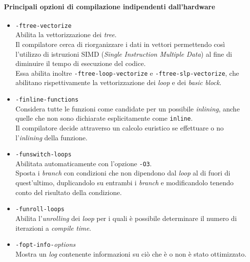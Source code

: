 \paragraph{Principali opzioni di compilazione indipendenti dall'hardware}

\begin{itemize}
  
  \item \verb|-ftree-vectorize|\\
  Abilita la vettorizzazione dei \emph{tree}.\\
  Il compilatore cerca di riorganizzare i dati in vettori permettendo così 
  l'utilizzo di istruzioni SIMD (\emph{Single Instruction Multiple Data}) al 
  fine di diminuire il tempo di esecuzione del codice.\\ %
  Essa abilita inoltre \verb|-ftree-loop-vectorize| e 
  \verb|-ftree-slp-vectorize|, che abilitano rispettivamente la vettorizzazione 
  dei \emph{loop} e dei \emph{basic block}.
  
  \item \verb|-finline-functions|\\
  Considera tutte le funzioni come candidate per un possibile \emph{inlining}, 
  anche quelle che non sono dichiarate esplicitamente come \verb|inline|.\\
  Il compilatore decide attraverso un calcolo euristico se effettuare o no 
  l'\emph{inlining} della funzione.
  
  \item \verb|-funswitch-loops|\\
  Abilitata automaticamente con l'opzione \verb|-O3|.\\
  Sposta i \emph{branch} con condizioni che non dipendono dal \emph{loop} al di 
  fuori di quest'ultimo, duplicandolo su entrambi i \emph{branch} e 
  modificandolo tenendo conto del risultato della condizione.
  
  \item \verb|-funroll-loops|\\
  Abilita l'\emph{unrolling} dei \emph{loop} per i quali è possibile 
  determinare il numero di iterazioni a \emph{compile time}.
  
    \item \verb|-fopt-info-|\emph{options}\\
    Mostra un \emph{log} contenente informazioni su ciò che è o non è stato 
    ottimizzato.
\end{itemize}

